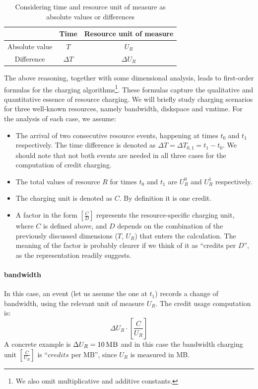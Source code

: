 \documentclass[preprint,10pt]{sigplanconf}
\newcommand{\DTime}{\ensuremath{T}\xspace} %
\newcommand{\DeltaDTime}{\ensuremath{\Delta{T}}\xspace}
\newcommand{\DUnitR}{\ensuremath{U_{R}}\xspace} %
\newcommand{\DeltaDUnitR}{\ensuremath{\Delta U_{R}}\xspace}
\newcommand{\MB}[1]{\ensuremath{#1\,\mbox{\sc MB}}}
\begin{document}
\begin{table}[htdp]
\label{tab:dt}
\begin{center}
\begin{tabular}{|c|c|c|}
\hline
&Time & Resource unit of measure \\
\hline
Absolute value & \DTime & \DUnitR \\
Difference & \DeltaDTime  & \DeltaDUnitR \\
\hline
\end{tabular}
\end{center}
\label{default}
\caption{Considering time and resource unit of measure as absolute values or differences
}
\end{table}%

The above reasoning, together with some dimensional analysis, leads to first-order formulas for the charging algorithms\footnote{We also omit multiplicative and additive constants.}. These formulas capture the qualitative and quantitative essence of resource charging. We will briefly  study charging scenarios for three well-known resources, namely \textsf{bandwidth}, \textsf{diskspace} and \textsf{vmtime}. For the analysis of each case, we assume: 
\begin{itemize}
\item The arrival of two consecutive resource events, happening at times $t_0$ and $t_1$ respectively. The time difference is denoted as $\Delta T = \Delta T_{0, 1} = t_1 - t_0$. We should note that not both events are needed in all three cases for the computation of credit charging.

\item The total values of resource $R$ for times $t_0$ and $t_1$ are $U_R^0$ and $U_R^1$ respectively.

\item The charging unit is denoted as $C$. By definition it is one credit.

\item A factor in the form $[\frac{C}{D}]$ represents the resource-specific charging unit, where $C$ is defined above, and $D$ depends on the combination of the previously discussed dimensions ($T$, $U_R$) that enters the calculation. The meaning of the factor is probably clearer if we think of it as ``credits per $D$'', as the representation readily suggests.
\end{itemize}

\paragraph{\textsf{bandwidth}}
In this case, an event (let us assume the one at $t_1$) records a change of bandwidth, using the relevant unit of measure $U_R$.  The credit usage computation is:
\begin{equation}
\label{eq:bandwidth}
\Delta U_R \cdot  [ \frac{C}{U_R} ]
\end{equation}
A concrete example is $\Delta U_R = \MB{10}$ and in this case the bandwidth charging unit $[ \frac{C}{U_R} ]$ is ``$credits$ per {\sc MB}'', since $U_R$ is measured in {\sc MB}.
\end{document}

